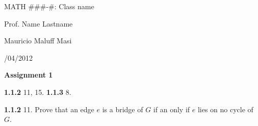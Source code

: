 \documentclass[letter,12pt]{article}
\begin{document}
\begin{singlespace}
\noindent MATH \#\#\#-\#: Class name

\noindent Prof. Name Lastname

\noindent Mauricio Maluff Masi

/04/2012
\end{singlespace}
{\centering
\large{\textbf{Assignment 1}}

}
\vspace{12pt}
\noindent\textbf{1.1.2} 11, 15. \textbf{1.1.3} 8.

\noindent\textbf{1.1.2} 11. Prove that an edge $e$ is a bridge of $G$ if an only if $e$ lies on no cycle of $G$.\\

{\centering
{}

}
\end{document}

